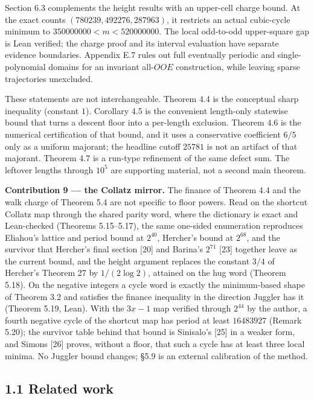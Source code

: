 \documentclass[12pt]{article}
\begin{document}
Section 6.3 complements the height results with an upper-cell charge
bound. At the exact counts \((780239,492276,287963)\), it restricts an
actual cubic-cycle minimum to \(350000000<m<520000000\). The local
odd-to-odd upper-square gap is Lean verified; the charge proof and its
interval evaluation have separate evidence boundaries. Appendix E.7
rules out full eventually periodic and single-polynomial domains for an
invariant all-\(OOE\) construction, while leaving sparse trajectories
unexcluded.

These statements are not interchangeable. Theorem 4.4 is the conceptual
sharp inequality (constant \(1\)). Corollary 4.5 is the convenient
length-only statewise bound that turns a descent floor into a per-length
exclusion. Theorem 4.6 is the numerical certification of that bound, and
it uses a conservative coefficient \(6/5\) only as a uniform majorant;
the headline cutoff \(25781\) is not an artifact of that majorant.
Theorem 4.7 is a run-type refinement of the same defect sum. The
leftover lengths through \(10^5\) are supporting material, not a second
main theorem.

\textbf{Contribution 9 --- the Collatz mirror.} The finance of Theorem
4.4 and the walk charge of Theorem 5.4 are not specific to floor powers.
Read on the shortcut Collatz map through the shared parity word, where
the dictionary is exact and Lean-checked (Theorems 5.15--5.17), the same
one-sided enumeration reproduces Eliahou's lattice and period bound at
\(2^{40}\), Hercher's bound at \(2^{68}\), and the survivor that
Hercher's final section {[}20{]} and Barina's \(2^{71}\) {[}23{]}
together leave as the current bound, and the height argument replaces
the constant \(3/4\) of Hercher's Theorem 27 by \(1/(2\log2)\), attained
on the hug word (Theorem 5.18). On the negative integers a cycle word is
exactly the minimum-based shape of Theorem 3.2 and satisfies the finance
inequality in the direction Juggler has it (Theorem 5.19, Lean). With
the \(3x-1\) map verified through \(2^{44}\) by the author, a fourth
negative cycle of the shortcut map has period at least \(16483927\)
(Remark 5.20); the survivor table behind that bound is Sinisalo's
{[}25{]} in a weaker form, and Simons {[}26{]} proves, without a floor,
that such a cycle has at least three local minima. No Juggler bound
changes; §5.9 is an external calibration of the method.

\subsection{1.1 Related work}\label{related-work}
\end{document}
